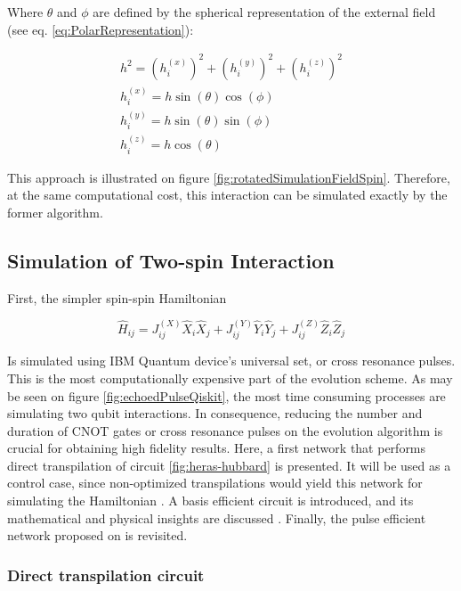   Where $\theta$ and $\phi$ are defined by the spherical representation of the external field (see eq. \ref{eq:PolarRepresentation}):

  \begin{gather}
    h^2 =  (h_i^{(x)})^2 + (h_i^{(y)})^2 + (h_i^{(z)})^2 \\
    h_i^{(x)} = h \sin(\theta)\cos(\phi) \\
    h_i^{(y)} = h \sin(\theta)\sin(\phi) \\
    h_i^{(z)} = h \cos(\theta)
    \label{eq:PolarRepresentation}
  \end{gather}

  This approach is illustrated on figure \ref{fig:rotatedSimulationFieldSpin}. Therefore, at the same computational cost, this interaction can be simulated exactly by the former algorithm.

  

  \subsection{Simulation of Two-spin Interaction}

  First, the simpler spin-spin Hamiltonian

  \begin{equation}
    \hat{H}_{ij} = J_{ij}^{(X)} \hat{X}_i \hat{X}_j + J_{ij}^{(Y)} \hat{Y}_i \hat{Y}_j + J_{ij}^{(Z)} \hat{Z}_i \hat{Z}_j
    \label{eq:SpinSpin}
  \end{equation}

  Is simulated using IBM Quantum device's universal set, or cross resonance pulses. This is the most computationally expensive part of the evolution scheme. As may be seen on figure \ref{fig:echoedPulseQiskit}, the most time consuming processes are simulating two qubit interactions. In consequence, reducing the number and duration of CNOT gates or cross resonance pulses on the evolution algorithm is crucial for obtaining high fidelity results. Here, a first network that performs direct transpilation of circuit \ref{fig:heras-hubbard} is presented. It will be used as a control case, since non-optimized transpilations would yield this network for simulating the Hamiltonian \cite{Qiskit}. A basis efficient circuit is introduced, and its mathematical and physical insights are discussed \cite{BellUniversalCartan}. Finally, the pulse efficient network proposed on \cite{RXZPulseEfficient} is revisited.
  
  \subsubsection{Direct transpilation circuit}

